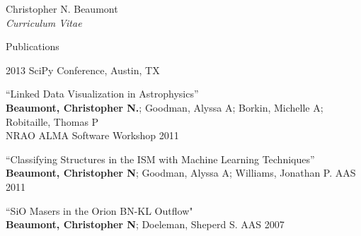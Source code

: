 \documentclass[10pt]{article}
\newenvironment{sublist}{%
	\begin{list}{}{%
		\setlength{\itemsep}{0em}\setlength{\parsep}{0em}%
		\setlength{\topsep}{0em}\setlength{\parskip}{0em}%
	}%
}%
{ \end{list} }
\begin{document}
\begin{cv}{Christopher N. Beaumont\\{\large \itshape Curriculum Vitae}}
\begin{cvlist}{Publications}
\begin{sublist}
	2013 SciPy Conference, Austin, TX \\
	\item ``Linked Data Visualization in Astrophysics''\\
	\textbf{Beaumont, Christopher N.}; Goodman, Alyssa A; Borkin, Michelle A; Robitaille, Thomas P \\
	NRAO ALMA Software Workshop 2011 \\
	\item ``Classifying Structures in the ISM with Machine Learning Techniques'' \\
	\textbf{Beaumont, Christopher N}; Goodman, Alyssa A; Williams, Jonathan P. AAS 2011 \\
	\item ``SiO Masers in the Orion BN-KL Outflow"\\
	\textbf{Beaumont, Christopher N}; Doeleman, Sheperd S. AAS 2007
	\end{sublist} 
\end{cvlist}
\setlength{\cvlabelwidth}{\oldcvlabelwidth}

\setlength{\oldcvlabelwidth}{\cvlabelwidth}
\setlength{\cvlabelwidth}{1em}
\setlength{\cvlabelwidth}{\oldcvlabelwidth}

\setlength{\oldcvlabelwidth}{\cvlabelwidth}
\setlength{\cvlabelwidth}{1em}
\begin{comment}
\begin{cvlist}{Technical Skills}
	\item \textbf{Proficient}
	\begin{sublist}
		\item Python, IDL 
	\end{sublist}
	\item \textbf{Familiar} 
	\begin{sublist}
		\item Mathematica, C, Java, Python, PHP, Perl
	\end{sublist}
\end{cvlist}
\setlength{\cvlabelwidth}{\oldcvlabelwidth}
\end{comment}

\end{cv}
\end{document}
